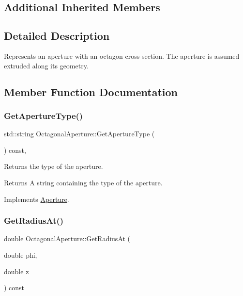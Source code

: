 \subsection*{Additional Inherited Members}


\subsection{Detailed Description}
Represents an aperture with an octagon cross-\/section. The aperture is assumed extruded along its geometry. 

\subsection{Member Function Documentation}
\mbox{\label{classOctagonalAperture_ada756a63c21912b26d79a5743bbd051f}} 
\subsubsection{\texorpdfstring{Get\+Aperture\+Type()}{GetApertureType()}}
{\footnotesize\ttfamily std\+::string Octagonal\+Aperture\+::\+Get\+Aperture\+Type (\begin{DoxyParamCaption}{ }\end{DoxyParamCaption}) const\hspace{0.3cm}{\ttfamily [inline]}, {\ttfamily [virtual]}}

Returns the type of the aperture. \begin{DoxyReturn}{Returns}
A string containing the type of the aperture. 
\end{DoxyReturn}


Implements \hyperlink{classAperture_ad7af612271a0586feea83c38549dfb75}{Aperture}.

\mbox{\label{classOctagonalAperture_ab79ca14c1d75522637bea3ffbbb0d8a4}} 
\subsubsection{\texorpdfstring{Get\+Radius\+At()}{GetRadiusAt()}}
{\footnotesize\ttfamily double Octagonal\+Aperture\+::\+Get\+Radius\+At (\begin{DoxyParamCaption}\item[{double}]{phi,  }\item[{double}]{z }\end{DoxyParamCaption}) const\hspace{0.3cm}{\ttfamily [virtual]}}

